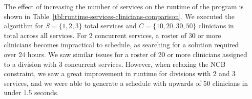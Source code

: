 The effect of increasing the number of services %
on the runtime of the program is shown in Table~\ref{tbl:runtime-services-clinicians-comparison}. We executed the algorithm for
$S = \{1, 2, 3\}$ total services and $C = \{10, 20, 30, 50\}$ clinicians in
total across all services. For 2 concurrent services, a roster of 30 or more
clinicians becomes impractical to schedule, as searching for a solution required
over 24 hours. We saw similar issues for a roster of 20 or more clinicians
assigned to a division with 3 concurrent services. However, when relaxing the
NCB constraint, we saw a great improvement in runtime for divisions with 2 and 3
services, and we were able to generate a schedule with upwards of 50 clinicians
in under 1.5 seconds.  %



